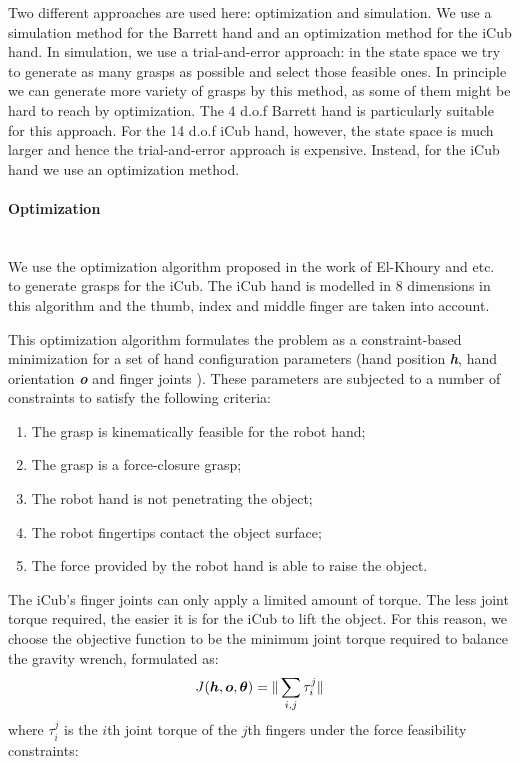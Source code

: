 Two different approaches are used here: optimization and simulation. We use a simulation method for the Barrett hand and an optimization method for the iCub hand. In simulation, we use a trial-and-error approach: in the state space we try to generate as many grasps as possible and select those feasible ones. In principle we can generate more variety of grasps by this method, as some of them might be hard to reach by optimization. The 4 d.o.f Barrett hand is particularly suitable for this approach. For the 14 d.o.f iCub hand, however, the state space is much larger and hence the trial-and-error approach is expensive. Instead, for the iCub hand we use an optimization method.


\paragraph{Optimization}
~\\
We use the optimization algorithm proposed in the work of El-Khoury and etc.~\citep{el2013generation} to generate grasps for the iCub.
The iCub hand is modelled in 8 dimensions in this algorithm and the thumb, index and middle finger are taken into account.

This optimization algorithm formulates the problem as a constraint-based minimization for a set of hand configuration parameters (hand position \textbf{\emph{h}}, hand orientation {\textbf{\emph{o}}} and finger joints {\boldsymbol{$\theta$}}). These parameters are subjected to a number of constraints to satisfy the following criteria:

\begin{enumerate}
\item The grasp is kinematically feasible for the robot hand;
\item The grasp is a force-closure grasp;
\item The robot hand is not penetrating the object;
\item The robot fingertips contact the object surface;
\item The force provided by the robot hand is able to raise the object.
\end{enumerate}


The iCub's finger joints can only apply a limited amount of torque.
The less joint torque required, the easier it is for the iCub to lift the object. For this reason, we choose the objective function to be the minimum joint torque required to balance the gravity wrench, formulated as:
\begin{equation}
J(\boldsymbol{h},\boldsymbol{o},\boldsymbol{\theta})=\Arrowvert \sum_{i,j} {{\tau}^j_i}\Arrowvert
 \label{quality}
 \end{equation}
where {$\tau$}$^j_i$ is the $i$th joint torque of the $j$th fingers under the force feasibility constraints:

